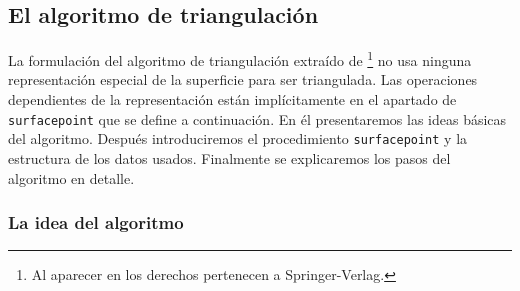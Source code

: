 \subsection{El algoritmo de triangulación}

La formulación del algoritmo de triangulación extraído de \cite{Hartmann03}\footnote{Al aparecer en \cite{Hartmann98} los derechos pertenecen a Springer-Verlag.} no usa ninguna representación especial de la superficie para ser triangulada. Las operaciones dependientes de la representación están implícitamente en el apartado de \texttt{surfacepoint} que se define a continuación. En él presentaremos las ideas básicas del algoritmo. Después introduciremos el procedimiento \texttt{surfacepoint} y la estructura de los datos usados. Finalmente se explicaremos los pasos del algoritmo en detalle.


\subsubsection{La idea del algoritmo}

